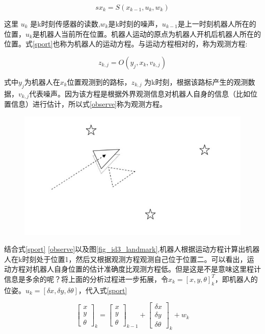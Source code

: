 \documentclass[10.5pt,twocolumn]{jbuaa}
\begin{document}
\begin{equation}s
\label{sport}
x_{k} = S(x_{k-1},u_{k},w_{k})
\end{equation}

这里 $u_{k}$ 是k时刻传感器的读数,$w_{k}$是k时刻的噪声，$u_{k-1}$是上一时刻机器人所在的位置，$u_{k}$是机器人当前所在位置。机器人运动的原点为机器人开机后机器人所在的位置。式\ref{sport}也称为机器人的运动方程。与运动方程相对的，称为观测方程:

\begin{equation}
\label{observe}
z_{k,j}=O(y_{j},x_{k},v_{k,j})
\end{equation}

式中$ y_{j} $为机器人在$ x_{k} $位置观测到的路标，$ z_{k,j} $ 为k时刻，根据该路标产生的观测数据，$ v_{k,j} $代表噪声。因为该方程是根据外界观测信息对机器人自身的信息（比如位置信息）进行估计，所以式\ref{observe}称为观测方程。

\begin{figure}[h!]
	\centering
	\includegraphics [scale=0.4,trim=0 0 0 0]{./image/landmark}
\end{figure}

结合式\ref{sport} \ref{observe}以及图\ref{fig_id3_landmark},机器人根据运动方程计算出机器人在k时刻处于位置1，然后又根据观测方程观测自己位于位置二。可以看出，运动方程对机器人自身位置的估计准确度比观测方程低。但是这是不是意味这里程计信息是多余的呢？将上面的分析过程进一步拓展，令$ x_{k} = [x,y,\theta]_{k}^{T} $，即机器人的位姿。$ u_{k} = [\delta x ,\delta y, \delta \theta] $，代入式\ref{sport}

\begin{equation}
\left[ \begin{array}{ccc}
x\\
y\\
\theta
\end{array} 
\right ]_{k} = \left[ \begin{array}{ccc}
x\\
y\\
\theta
\end{array} 
\right ]_{k-1} + \left[ \begin{array}{ccc}
\delta x\\
\delta y\\
\delta \theta
\end{array} 
\right ]_{k} + w_{k}
\end{equation}
\end{document}

